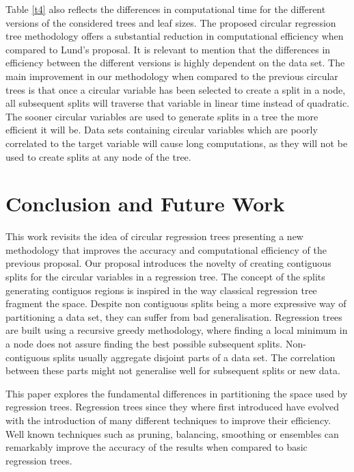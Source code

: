 \documentclass[times,twocolumn,final,authoryear]{elsarticle}
\begin{document}
Table \ref{t4} also reflects the differences in computational time for the different versions of the considered trees and leaf sizes. The proposed circular regression tree methodology offers a substantial reduction in computational efficiency when compared to Lund's proposal. It is relevant to mention that the differences in efficiency between the different versions is highly dependent on the data set. The main improvement in our methodology when compared to the previous circular trees is that once a circular variable has been selected to create a split in a node, all subsequent splits will traverse that variable in linear time instead of quadratic. The sooner circular variables are used to generate splits in a tree the more efficient it will be. Data sets containing circular variables which are poorly correlated to the target variable will cause long computations, as they will not be used to create splits at any node of the tree. 

\section{Conclusion and Future Work}
\label{sec:5}
This work revisits the idea of circular regression trees presenting a new methodology that improves the accuracy and computational efficiency of the previous proposal. Our proposal introduces the novelty of creating contiguous splits for the circular variables in a regression tree. The concept of the splits generating contiguos regions is inspired in the way classical regression tree fragment the space. Despite non contiguous splits being a more expressive way of partitioning a data set, they can suffer from bad generalisation. Regression trees are built using a recursive greedy methodology, where finding a local minimum in a node does not assure finding the best possible subsequent splits. Non-contiguous splits usually aggregate disjoint parts of a data set. The correlation between these parts might not generalise well for subsequent splits or new data.

This paper explores the fundamental differences in partitioning the space used by regression trees. Regression trees since they where first introduced have evolved with the introduction of many different techniques to improve their efficiency. Well known techniques such as pruning, balancing, smoothing \citep{Breimanetal1984, Quinlan1993} or ensembles \citep{Buhlmann2012} can remarkably improve the accuracy of the results when compared to basic regression trees.
\end{document}
